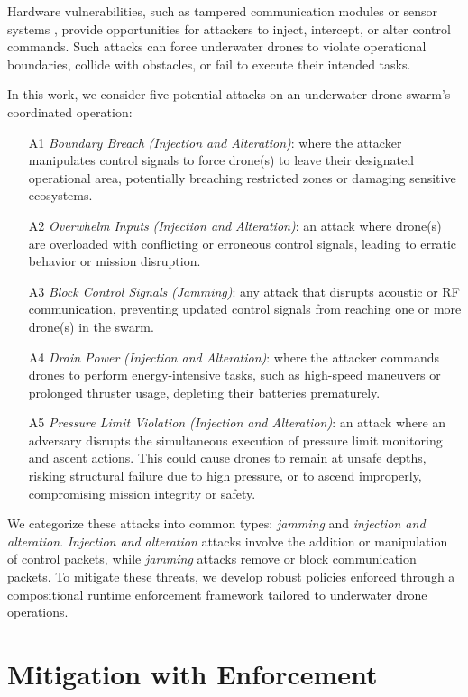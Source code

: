 Hardware vulnerabilities, such as tampered communication modules or sensor systems \cite{belous2020hardware}, provide opportunities for attackers to inject, intercept, or alter control commands. Such attacks can force underwater drones to violate operational boundaries, collide with obstacles, or fail to execute their intended tasks.

In this work, we consider five potential attacks on an underwater drone swarm's coordinated operation:
\begin{itemize}
	\item[A1] \emph{Boundary Breach} \textit{(Injection and Alteration)}: where the attacker manipulates control signals to force drone(s) to leave their designated operational area, potentially breaching restricted zones or damaging sensitive ecosystems.
	\item[A2] \emph{Overwhelm Inputs} \textit{(Injection and Alteration)}: an attack where drone(s) are overloaded with conflicting or erroneous control signals, leading to erratic behavior or mission disruption.
	\item[A3] \emph{Block Control Signals} \textit{(Jamming)}: any attack that disrupts acoustic or RF communication, preventing updated control signals from reaching one or more drone(s) in the swarm.
	\item[A4] \emph{Drain Power} \textit{(Injection and Alteration)}: where the attacker commands drones to perform energy-intensive tasks, such as high-speed maneuvers or prolonged thruster usage, depleting their batteries prematurely.
	\item[A5] \emph{Pressure Limit Violation}  \textit{(Injection and Alteration)}: an attack where an adversary disrupts the simultaneous execution of pressure limit monitoring and ascent actions. This could cause drones to remain at unsafe depths, risking structural failure due to high pressure, or to ascend improperly, compromising mission integrity or safety.
\end{itemize}

We categorize these attacks into common types: \textit{jamming} and \textit{injection and alteration}. \textit{Injection and alteration} attacks involve the addition or manipulation of control packets, while \textit{jamming} attacks remove or block communication packets. To mitigate these threats, we develop robust policies enforced through a compositional runtime enforcement framework tailored to underwater drone operations.


\section{Mitigation with Enforcement}
\label{MitigationwithEnforcement}

